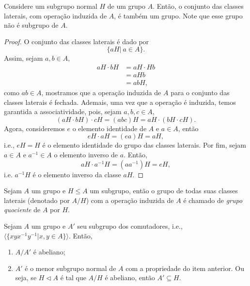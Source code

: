 \documentclass[11pt,openany]{book}
\newcommand{\gen}[1]{\ensuremath{\langle #1\rangle}}
\begin{document}
\begin{theorem}
\label{theor:grupo_quociente}
    Considere um subgrupo normal $H$ de um grupo $A$. Então, o conjunto das classes laterais, com operação induzida de $A$, é também um grupo. Note que esse grupo não é subgrupo de $A$.
\end{theorem}

\begin{proof}
    O conjunto das classes laterais é dado por
    \[\{aH | \ a \in A\}.\]
    Assim, sejam $a, b \in A$,
    \begin{align*}
        aH \cdot bH &= aH \cdot Hb \\
        &= aHb \\
        &= abH,
    \end{align*}
    como $ab \in A$, mostramos que a operação induzida de $A$ para o conjunto das classes laterais é fechada.
    Ademais, uma vez que a operação é induzida, temos garantida a associatividade, pois, sejam $a,b,c \in A$,
    \[(aH \cdot bH) \cdot cH = (abc)H = aH \cdot (bH \cdot cH).\]
    Agora, consideremos $e$ o elemento identidade de $A$ e $a \in A$, então
    \[eH \cdot aH = (ea)H = aH,\]
    i.e., $eH = H$ é o elemento identidade do grupo das classes laterais.
    Por fim, sejam $a \in A$ e $a^{-1} \in A$ o elemento inverso de $a$. Então,
    \[aH \cdot a^{-1}H = (aa^{-1})H = eH,\]
    i.e. $a^{-1}H$ é o elemento inverso da classe $aH$.
\end{proof}

\begin{definition}
\label{def:grupo_quociente}
    Sejam $A$ um grupo e $H \leq A$ um subgrupo, então o grupo de todas suas classes laterais (denotado por $A/H$) com a operação induzida de $A$ é chamado de \textit{grupo quociente} de $A$ por $H$.
\end{definition}

\begin{proposition}
\label{prop:grupo_quociente_e_permutadores}
    Sejam $A$ um grupo e $A'$ seu subgrupo dos comutadores, i.e., $\gen{\{xyx^{-1}y^{-1} | x,y \in A\}}$. Então,
    \begin{enumerate}
        \item $A/A'$ é abeliano; \label{item:permutadores_first}
        \item $A'$ é o menor subgrupo normal de $A$ com a propriedade do item anterior. Ou seja, se $H \triangleleft A$ é tal que $A/H$ é abeliano, então $A' \subseteq H$. \label{item:permutadores_second}
    \end{enumerate}
\end{proposition}
\end{document}
